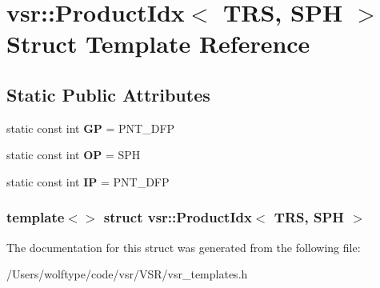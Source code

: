 \hypertarget{structvsr_1_1_product_idx_3_01_t_r_s_00_01_s_p_h_01_4}{\section{vsr\-:\-:Product\-Idx$<$ T\-R\-S, S\-P\-H $>$ Struct Template Reference}
\label{structvsr_1_1_product_idx_3_01_t_r_s_00_01_s_p_h_01_4}
}
\subsection*{Static Public Attributes}
\begin{DoxyCompactItemize}
\item 
\hypertarget{structvsr_1_1_product_idx_3_01_t_r_s_00_01_s_p_h_01_4_ad572022e3cb67bdd5503f8bc0bcc9ed1}{static const int {\bfseries G\-P} = P\-N\-T\-\_\-\-D\-F\-P}\label{structvsr_1_1_product_idx_3_01_t_r_s_00_01_s_p_h_01_4_ad572022e3cb67bdd5503f8bc0bcc9ed1}

\item 
\hypertarget{structvsr_1_1_product_idx_3_01_t_r_s_00_01_s_p_h_01_4_a6cf88b4ed0df8495616f22a5e4bc6d04}{static const int {\bfseries O\-P} = S\-P\-H}\label{structvsr_1_1_product_idx_3_01_t_r_s_00_01_s_p_h_01_4_a6cf88b4ed0df8495616f22a5e4bc6d04}

\item 
\hypertarget{structvsr_1_1_product_idx_3_01_t_r_s_00_01_s_p_h_01_4_a2908a4c63874b0072f57ea3b47712948}{static const int {\bfseries I\-P} = P\-N\-T\-\_\-\-D\-F\-P}\label{structvsr_1_1_product_idx_3_01_t_r_s_00_01_s_p_h_01_4_a2908a4c63874b0072f57ea3b47712948}

\end{DoxyCompactItemize}
\subsubsection*{template$<$$>$ struct vsr\-::\-Product\-Idx$<$ T\-R\-S, S\-P\-H $>$}



The documentation for this struct was generated from the following file\-:\begin{DoxyCompactItemize}
\item 
/\-Users/wolftype/code/vsr/\-V\-S\-R/vsr\-\_\-templates.\-h\end{DoxyCompactItemize}
